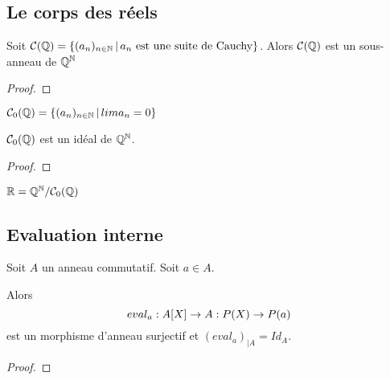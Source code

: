 \subsection{Le corps des réels}

\begin{proposition}
	Soit $\mathcal{C}(\mathbb{Q}) =
	\left\{(a_{n})_{n \in \mathbb{N}} \, | \, a_{n} \text{ est une suite de Cauchy} \right\}$.
	Alors $\mathcal{C}(\mathbb{Q})$ est un sous-anneau de $\mathbb{Q}^{\mathbb{N}}$
\end{proposition}

\ifdefined\outputproof
\begin{proof}

\end{proof}
\fi

\begin{definition}
	$\mathcal{C}_{0}(\mathbb{Q}) = \left\{(a_{n})_{n \in \mathbb{N}} \, | \, lim
		a_{n} = 0 \right\}$
\end{definition}

\begin{proposition}
	$\mathcal{C}_{0}(\mathbb{Q})$ est un idéal de $\mathbb{Q}^{\mathbb{N}}$.
\end{proposition}

\ifdefined\outputproof
\begin{proof}

\end{proof}
\fi

\begin{definition}
	$\mathbb{R} = \mathbb{Q}^{\mathbb{N}} / \mathcal{C}_{0}(\mathbb{Q})$
\end{definition}

\subsection{Evaluation interne}

\begin{proposition}
	Soit $A$ un anneau commutatif. Soit $a \in A$.

	Alors 
	\begin{equation}
		eval_{a} : A[X] \rightarrow A : P(X) \rightarrow P(a)
		\label{<++>}
	\end{equation}
	est un morphisme d'anneau surjectif et ${(eval_{a})}_{|A} = Id_{A}$.
\end{proposition}

\ifdefined\outputproof
\begin{proof}

\end{proof}
\fi


